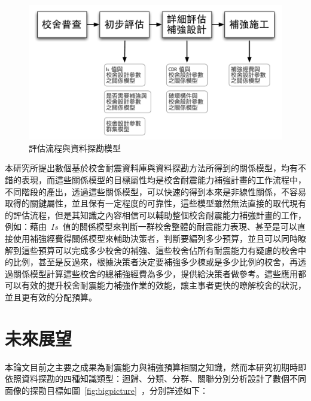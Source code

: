 \begin{figure}[hbtp]
  \begin{center}
    \includegraphics[width=1.0\textwidth]{figures/survey-flow-con.pdf}
    \caption{評估流程與資料探勘模型} 
    \label{fig:FLOW-con}
  \end{center}
\end{figure}

本研究所提出數個基於校舍耐震資料庫與資料探勘方法所得到的關係模型，均有不錯的表現，而這些關係模型的目標屬性均是校舍耐震能力補強計畫的工作流程中，不同階段的產出，透過這些關係模型，可以快速的得到本來是非線性關係，不容易取得的關鍵屬性，並且保有一定程度的可靠性，這些模型雖然無法直接的取代現有的評估流程，但是其知識之內容相信可以輔助整個校舍耐震能力補強計畫的工作，例如：藉由~$Is$~值的關係模型來判斷一群校舍整體的耐震能力表現、甚至是可以直接使用補強經費得關係模型來輔助決策者，判斷要編列多少預算，並且可以同時瞭解到這些預算可以完成多少校舍的補強、這些校舍佔所有耐震能力有疑慮的校舍中的比例，甚至是反過來，根據決策者決定要補強多少棟或是多少比例的校舍，再透過關係模型計算這些校舍的總補強經費為多少，提供給決策者做參考。這些應用都可以有效的提升校舍耐震能力補強作業的效能，讓主事者更快的瞭解校舍的狀況，並且更有效的分配預算。

\section{未來展望} 

本論文目前之主要之成果為耐震能力與補強預算相關之知識，然而本研究初期時即依照資料探勘的四種知識類型：迴歸、分類、分群、關聯分別分析設計了數個不同面像的探勘目標如圖~\ref{fig:bigpicture}~，分別詳述如下：

